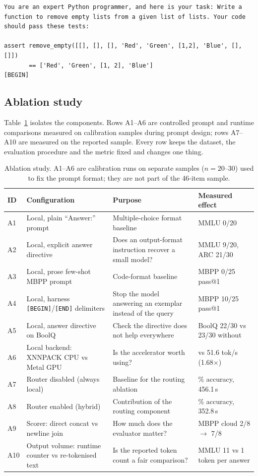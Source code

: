 \documentclass[11pt,a4paper]{article}
\begin{document}
{\footnotesize
\begin{verbatim}
You are an expert Python programmer, and here is your task: Write a
function to remove empty lists from a given list of lists. Your code
should pass these tests:

assert remove_empty([[], [], [], 'Red', 'Green', [1,2], 'Blue', [], []])
       == ['Red', 'Green', [1, 2], 'Blue']
[BEGIN]
\end{verbatim}}

\subsection{Ablation study}
\label{sec:ablation}
Table~\ref{tab:ablation} isolates the components. Rows A1--A6 are controlled
prompt and runtime comparisons measured on calibration samples during prompt
design; rows A7--A10 are measured on the reported sample. Every row keeps the
dataset, the evaluation procedure and the metric fixed and changes one thing.

\begin{table}[!htbp]
\centering
\footnotesize
\caption{Ablation study. A1--A6 are calibration runs on separate samples
($n=20$--$30$) used to fix the prompt format; they are not part of the
46-item sample.}
\label{tab:ablation}
\setlength{\tabcolsep}{4pt}
\begin{tabular}{@{}l>{\raggedright\arraybackslash}p{4.1cm}>{\raggedright\arraybackslash}p{4.4cm}>{\raggedright\arraybackslash}p{3.3cm}@{}}
\toprule
ID & Configuration & Purpose & Measured effect \\
\midrule
A1 & Local, plain ``Answer:'' prompt & Multiple-choice format baseline & MMLU 0/20 \\
A2 & Local, explicit answer directive & Does an output-format instruction recover a small model? & MMLU 9/20, ARC 21/30 \\
A3 & Local, prose few-shot MBPP prompt & Code-format baseline & MBPP 0/25 pass@1 \\
A4 & Local, harness \texttt{[BEGIN]}/\texttt{[END]} delimiters & Stop the model answering an exemplar instead of the query & MBPP 10/25 pass@1 \\
A5 & Local, answer directive on BoolQ & Check the directive does not help everywhere & BoolQ 22/30 vs 23/30 without \\
A6 & Local backend: XNNPACK CPU vs Metal GPU & Is the accelerator worth using? & 30.7 vs 51.6 tok/s (1.68$\times$) \\
A7 & Router disabled (always local) & Baseline for the routing ablation & 58.7\% accuracy, 456.1\,s \\
A8 & Router enabled (hybrid) & Contribution of the routing component & 93.5\% accuracy, 352.8\,s \\
A9 & Scorer: direct concat vs newline join & How much does the evaluator matter? & MBPP cloud 2/8 $\rightarrow$ 7/8 \\
A10 & Output volume: runtime counter vs re-tokenised text & Is the reported token count a fair comparison? & MMLU 11 vs 1 token per answer \\
\bottomrule
\end{tabular}
\end{table}
\end{document}

